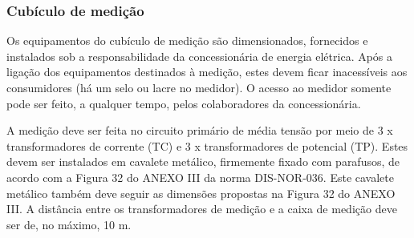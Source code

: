 \subsubsection{Cubículo de medição}

Os equipamentos do cubículo de medição são dimensionados, fornecidos e instalados sob a responsabilidade da concessionária de energia elétrica. Após a ligação dos equipamentos destinados à medição, estes devem ficar inacessíveis aos consumidores (há um selo ou lacre no medidor). O acesso ao medidor somente pode ser feito, a qualquer tempo, pelos colaboradores da concessionária.

A medição deve ser feita no circuito primário de média tensão por meio de 3 x transformadores de corrente (TC) e 3 x transformadores de potencial (TP). Estes devem ser instalados em cavalete metálico, firmemente fixado com parafusos, de acordo com a Figura 32 do ANEXO III da norma DIS-NOR-036. Este cavalete metálico também deve seguir as dimensões propostas na Figura 32 do ANEXO III. A distância entre os transformadores de medição e a caixa de medição deve ser de, no máximo, 10 m.

